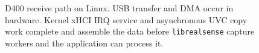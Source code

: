 \begin{figure}[t]
  \caption{D400 receive path on Linux.  USB transfer and DMA occur in
  hardware.  Kernel xHCI IRQ service and asynchronous UVC copy work complete
  and assemble the data before \texttt{librealsense} capture workers and the
  application can process it.}
  \label{fig:linux-usb-path}
\end{figure}
